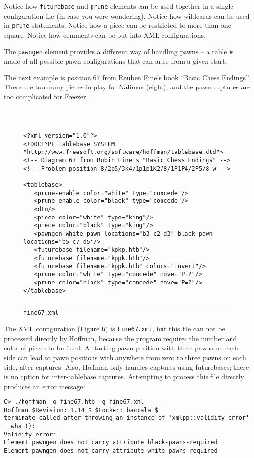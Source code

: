 \documentclass[11pt]{article}
\begin{document}
Notice how {\tt futurebase} and {\tt prune} elements can be used
together in a single configuration file (in case you were wondering).
Notice how wildcards can be used in {\tt prune} statements.  Notice
how a piece can be restricted to more than one square.  Notice how
comments can be put into XML configurations.

The {\tt pawngen} element provides a different way of handling pawns
-- a table is made of all possible pawn configurations that can
arise from a given start.

The next example is position 67 from Reuben Fine's book ``Basic Chess
Endings''.  There are too many pieces in play for Nalimov (eight), and
the pawn captures are too complicated for Freezer.

\showboard

\begin{figure}
\hrule\ 
{\small\begin{verbatim}
<?xml version="1.0"?>
<!DOCTYPE tablebase SYSTEM "http://www.freesoft.org/software/hoffman/tablebase.dtd">
<!-- Diagram 67 from Rubin Fine's "Basic Chess Endings" -->
<!-- Problem position 8/2p5/3k4/1p1p1K2/8/1P1P4/2P5/8 w -->

<tablebase>
   <prune-enable color="white" type="concede"/>
   <prune-enable color="black" type="concede"/>
   <dtm/>
   <piece color="white" type="king"/>
   <piece color="black" type="king"/>
   <pawngen white-pawn-locations="b3 c2 d3" black-pawn-locations="b5 c7 d5"/>
   <futurebase filename="kpkp.htb"/>
   <futurebase filename="kppk.htb"/>
   <futurebase filename="kppk.htb" colors="invert"/>
   <prune color="white" type="concede" move="P=?"/>
   <prune color="black" type="concede" move="P=?"/>
</tablebase>
\end{verbatim}}
\hrule
\caption{\tt fine67.xml}
\end{figure}

The XML configuration (Figure 6) is {\tt fine67.xml}, but this file
can not be processed directly by Hoffman, because the program requires
the number and color of pieces to be fixed.  A starting pawn position
with three pawns on each side can lead to pawn positions with anywhere
from zero to three pawns on each side, after captures.  Also, Hoffman
only handles captures using futurebases; there is no option for
inter-tablebase captures.  Attempting to process this file
directly produces an error message:

\begin{verbatim}
C> ./hoffman -o fine67.htb -g fine67.xml
Hoffman $Revision: 1.14 $ $Locker: baccala $
terminate called after throwing an instance of 'xmlpp::validity_error'
  what():  
Validity error:
Element pawngen does not carry attribute black-pawns-required
Element pawngen does not carry attribute white-pawns-required


\end{verbatim}
\end{document}
